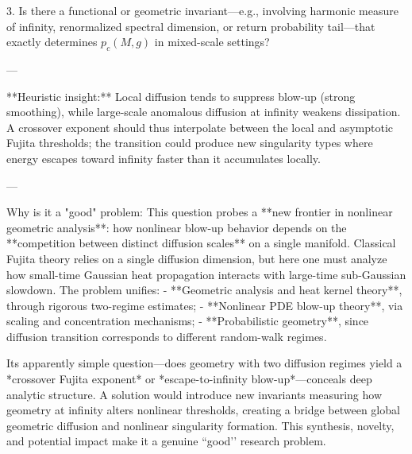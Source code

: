 3. Is there a functional or geometric invariant—e.g., involving harmonic measure of infinity, renormalized spectral dimension, or return probability tail—that exactly determines \(p_c(M,g)\) in mixed-scale settings?

---

**Heuristic insight:**  Local diffusion tends to suppress blow-up (strong smoothing), while large-scale anomalous diffusion at infinity weakens dissipation. A crossover exponent should thus interpolate between the local and asymptotic Fujita thresholds; the transition could produce new singularity types where energy escapes toward infinity faster than it accumulates locally.

---

Why is it a "good" problem:  
This question probes a **new frontier in nonlinear geometric analysis**: how nonlinear blow-up behavior depends on the **competition between distinct diffusion scales** on a single manifold. Classical Fujita theory relies on a single diffusion dimension, but here one must analyze how small-time Gaussian heat propagation interacts with large-time sub-Gaussian slowdown. The problem unifies:
- **Geometric analysis and heat kernel theory**, through rigorous two-regime estimates;
- **Nonlinear PDE blow-up theory**, via scaling and concentration mechanisms;
- **Probabilistic geometry**, since diffusion transition corresponds to different random-walk regimes.

Its apparently simple question—does geometry with two diffusion regimes yield a *crossover Fujita exponent* or *escape-to-infinity blow-up*—conceals deep analytic structure. A solution would introduce new invariants measuring how geometry at infinity alters nonlinear thresholds, creating a bridge between global geometric diffusion and nonlinear singularity formation.  This synthesis, novelty, and potential impact make it a genuine “good’’ research problem.